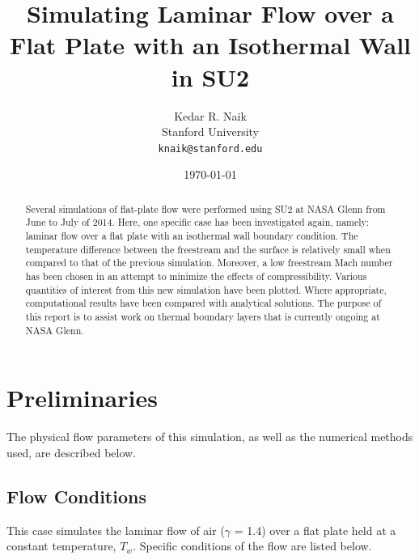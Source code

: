\documentclass[12pt,letterpaper]{article}
\begin{document}
\title{Simulating Laminar Flow over a Flat Plate with an Isothermal Wall in SU2}
\author{Kedar R. Naik \\
 Stanford University \\
 \texttt{knaik@stanford.edu}}
\date{\today}
\maketitle

\begin{abstract}
Several simulations of flat-plate flow were performed using SU2 at NASA Glenn from June to July of 2014. Here, one specific case has been investigated again, namely: laminar flow over a flat plate with an isothermal wall boundary condition. The temperature difference between the freestream and the surface is relatively small when compared to that of the previous simulation. Moreover, a low freestream Mach number has been chosen in an attempt to minimize the effects of compressibility. Various quantities of interest from this new simulation have been plotted. Where appropriate, computational results have been compared with analytical solutions. The purpose of this report is to assist work on thermal boundary layers that is currently ongoing at NASA Glenn.
\end{abstract}

\section*{Preliminaries}
The physical flow parameters of this simulation, as well as the numerical methods used, are described below.

\subsection*{Flow Conditions}
This case simulates the laminar flow of air ($\gamma$ = 1.4) over a flat plate held at a constant temperature, $T_w$. Specific conditions of the flow are listed below.
\end{document}
